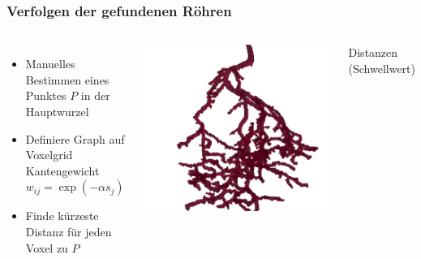 \documentclass[final,ngerman,ignorenonframetext,compress]{beamer}
\begin{document}
	\begin{frame}
		\frametitle{Verfolgen der gefundenen R\"ohren}
		\begin{columns}
			\begin{itemize}
				\item Manuelles Bestimmen eines Punktes $P$ in der
					Hauptwurzel
				\item Definiere Graph auf Voxelgrid
					Kantengewicht $w_{ij}=\exp(-\alpha s_j)$
				\item Finde k\"urzeste Distanz f\"ur jeden Voxel zu $P$
			\end{itemize}
			\includegraphics[width=\linewidth]{img/L2_22aug_Ansicht2_Dijkstra.PNG}

			\begin{center}Distanzen (Schwellwert)\end{center}
			\end{columns}
	\end{frame}
\end{document}
